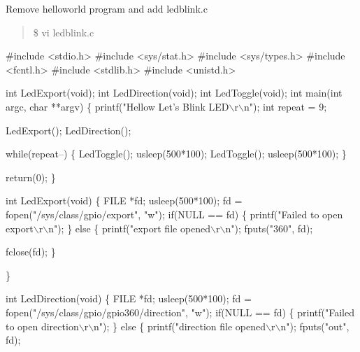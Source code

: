 \begin{DoxyItemize}
\item Remove helloworld program and add ledblink.\+c
\end{DoxyItemize}

\begin{quote}
\$ vi ledblink.\+c \end{quote}

\begin{DoxyCode}
\textcolor{preprocessor}{#include <stdio.h>}
\textcolor{preprocessor}{#include <sys/stat.h>}
\textcolor{preprocessor}{#include <sys/types.h>}
\textcolor{preprocessor}{#include <fcntl.h>}
\textcolor{preprocessor}{#include <stdlib.h>}
\textcolor{preprocessor}{#include <unistd.h>}

\textcolor{keywordtype}{int} LedExport(\textcolor{keywordtype}{void});
\textcolor{keywordtype}{int} LedDirection(\textcolor{keywordtype}{void});
\textcolor{keywordtype}{int} LedToggle(\textcolor{keywordtype}{void});
\textcolor{keywordtype}{int} main(\textcolor{keywordtype}{int} argc, \textcolor{keywordtype}{char} **argv)
\{
    printf(\textcolor{stringliteral}{"Hellow Let's Blink LED\(\backslash\)r\(\backslash\)n"});
    \textcolor{keywordtype}{int} repeat = 9;

     LedExport();
     LedDirection();

    \textcolor{keywordflow}{while}(repeat--)
    \{
        LedToggle();
        usleep(500*100);
        LedToggle();
        usleep(500*100);    
    \}


    \textcolor{keywordflow}{return}(0);
\}


\textcolor{keywordtype}{int} LedExport(\textcolor{keywordtype}{void})
\{
    FILE *fd;
        usleep(500*100);        
        fd = fopen(\textcolor{stringliteral}{"/sys/class/gpio/export"}, \textcolor{stringliteral}{"w"});
        \textcolor{keywordflow}{if}(NULL == fd)
        \{
                printf(\textcolor{stringliteral}{"Failed to open export\(\backslash\)r\(\backslash\)n"});
        \}       
        \textcolor{keywordflow}{else}
        \{
                printf(\textcolor{stringliteral}{"export file opened\(\backslash\)r\(\backslash\)n"});
                fputs(\textcolor{stringliteral}{"360"}, fd);

                fclose(fd);
        \}

\}

\textcolor{keywordtype}{int} LedDirection(\textcolor{keywordtype}{void})
\{
    FILE *fd;
        usleep(500*100);
        fd = fopen(\textcolor{stringliteral}{"/sys/class/gpio/gpio360/direction"}, \textcolor{stringliteral}{"w"});
        \textcolor{keywordflow}{if}(NULL == fd)
        \{
                printf(\textcolor{stringliteral}{"Failed to open direction\(\backslash\)r\(\backslash\)n"});
        \}       
        \textcolor{keywordflow}{else}
        \{
                printf(\textcolor{stringliteral}{"direction file opened\(\backslash\)r\(\backslash\)n"});
                fputs(\textcolor{stringliteral}{"out"}, fd);


\end{DoxyCode}
